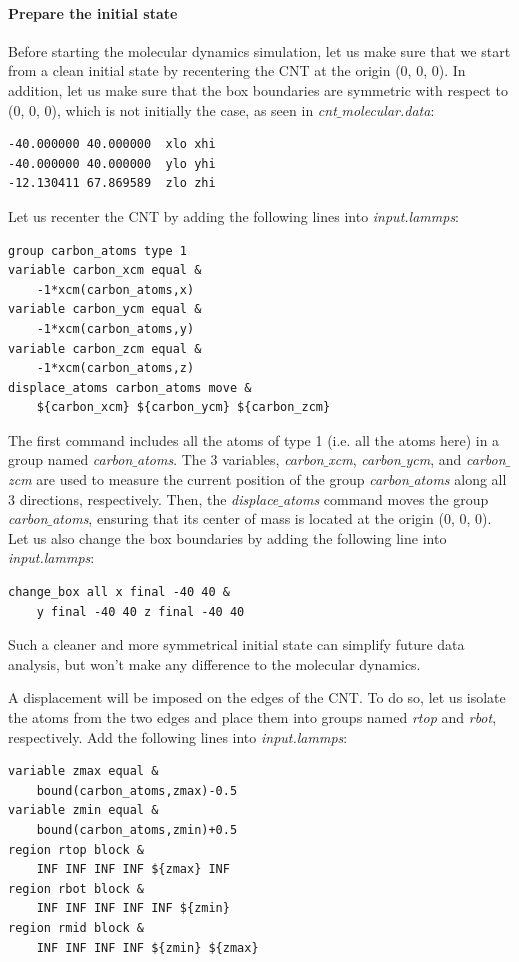 \documentclass[9pt,tutorial]{livecoms}
\begin{document}
\paragraph{Prepare the initial state}
Before starting the molecular dynamics simulation, let us make sure that we start from a clean initial state
by recentering the CNT at the origin (0, 0, 0). In addition, let us make sure that the box boundaries are symmetric with respect to (0, 0, 0), which is not initially the case, as seen in \textit{cnt$\_$molecular.data}:
{\normalsize \begin{verbatim}
-40.000000 40.000000  xlo xhi
-40.000000 40.000000  ylo yhi
-12.130411 67.869589  zlo zhi
\end{verbatim}}
Let us recenter the CNT by adding the following lines into \textit{input.lammps}:
{\normalsize \begin{verbatim}
group carbon_atoms type 1
variable carbon_xcm equal &
    -1*xcm(carbon_atoms,x)
variable carbon_ycm equal &
    -1*xcm(carbon_atoms,y)
variable carbon_zcm equal &
    -1*xcm(carbon_atoms,z)
displace_atoms carbon_atoms move &
    ${carbon_xcm} ${carbon_ycm} ${carbon_zcm}
\end{verbatim}}
The first command includes all the atoms of type 1 (i.e. all the atoms here) in a group named \textit{carbon$\_$atoms}.
The 3 variables, \textit{carbon$\_$xcm}, \textit{carbon$\_$ycm}, and \textit{carbon$\_$zcm} are used to measure
the current position of the group \textit{carbon$\_$atoms} along all 3 directions, respectively. Then, the \textit{displace$\_$atoms} command moves the group \textit{carbon$\_$atoms}, ensuring that its center of mass is located at the origin (0, 0, 0).
Let us also change the box boundaries by adding the following line into \textit{input.lammps}:
{\normalsize \begin{verbatim}
change_box all x final -40 40 &
    y final -40 40 z final -40 40
\end{verbatim}}
Such a cleaner and more symmetrical initial state can simplify future data analysis, but won't make any difference to the molecular dynamics.

A displacement will be imposed on the edges of the CNT. To do so, let us isolate the atoms from the two edges and place them into groups named \textit{rtop} and \textit{rbot}, respectively. Add the following lines into \textit{input.lammps}:
{\normalsize \begin{verbatim}
variable zmax equal &
    bound(carbon_atoms,zmax)-0.5
variable zmin equal &
    bound(carbon_atoms,zmin)+0.5
region rtop block &
    INF INF INF INF ${zmax} INF
region rbot block &
    INF INF INF INF INF ${zmin}
region rmid block &
    INF INF INF INF ${zmin} ${zmax}
\end{verbatim}}
\end{document}
